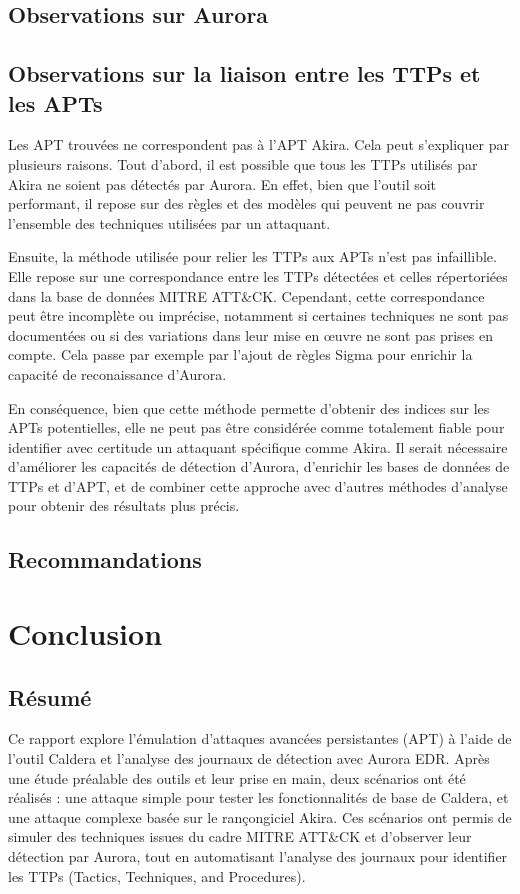\documentclass[12pt,letterpaper]{article}
\begin{document}
\subsection{Observations sur Aurora}

\subsection{Observations sur la liaison entre les TTPs et les APTs}
Les APT trouvées ne correspondent pas à l'APT Akira. Cela peut s'expliquer par plusieurs raisons.
Tout d'abord, il est possible que tous les TTPs utilisés par Akira ne soient pas détectés par Aurora.
En effet, bien que l'outil soit performant, il repose sur des règles et des modèles qui peuvent ne pas couvrir l'ensemble des techniques utilisées par un attaquant.

\bigskip

Ensuite, la méthode utilisée pour relier les TTPs aux APTs n'est pas infaillible.
Elle repose sur une correspondance entre les TTPs détectées et celles répertoriées dans la base de données MITRE ATT\&CK.
Cependant, cette correspondance peut être incomplète ou imprécise, notamment si certaines techniques ne sont pas documentées ou si des variations dans leur mise en œuvre ne sont pas prises en compte.
Cela passe par exemple par l'ajout de règles Sigma pour enrichir la capacité de reconaissance d'Aurora.

\bigskip

En conséquence, bien que cette méthode permette d'obtenir des indices sur les APTs potentielles, elle ne peut pas être considérée comme totalement fiable pour identifier avec certitude un attaquant spécifique comme Akira.
Il serait nécessaire d'améliorer les capacités de détection d'Aurora, d'enrichir les bases de données de TTPs et d'APT, et de combiner cette approche avec d'autres méthodes d'analyse pour obtenir des résultats plus précis.

\subsection{Recommandations}

\section{Conclusion}

\subsection{Résumé}
Ce rapport explore l'émulation d'attaques avancées persistantes (APT) à l'aide de l'outil Caldera et l'analyse des journaux de détection avec Aurora EDR.
Après une étude préalable des outils et leur prise en main, deux scénarios ont été réalisés : une attaque simple pour tester les fonctionnalités de base de Caldera, et une attaque complexe basée sur le rançongiciel Akira.
Ces scénarios ont permis de simuler des techniques issues du cadre MITRE ATT\&CK et d'observer leur détection par Aurora, tout en automatisant l'analyse des journaux pour identifier les TTPs (Tactics, Techniques, and Procedures).
\end{document}
